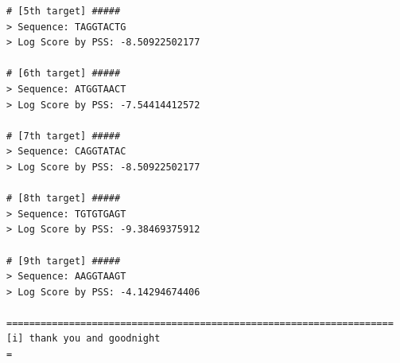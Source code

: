 \begin{lstlisting}[caption=Der Konsolenoutput des PSS Programms. Als Zielsequenzen zum Berechnen eines Scores wurde dasselbe File verwendet\, wie zum Einlesen des alignierten Sequenzen.]
# [5th target] #####
> Sequence: TAGGTACTG
> Log Score by PSS: -8.50922502177

# [6th target] #####
> Sequence: ATGGTAACT
> Log Score by PSS: -7.54414412572

# [7th target] #####
> Sequence: CAGGTATAC
> Log Score by PSS: -8.50922502177

# [8th target] #####
> Sequence: TGTGTGAGT
> Log Score by PSS: -9.38469375912

# [9th target] #####
> Sequence: AAGGTAAGT
> Log Score by PSS: -4.14294674406

====================================================================
[i] thank you and goodnight
=
\end{lstlisting}

\pagebreak
{}


\pagebreak


\pagebreak


